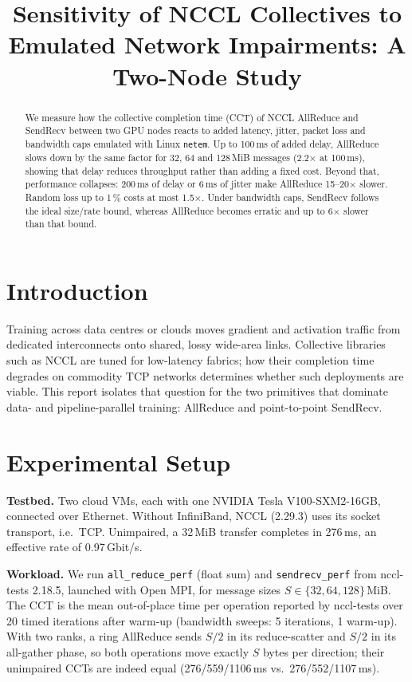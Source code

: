 \documentclass[conference,10pt,a4paper]{IEEEtran}
\begin{document}
\title{Sensitivity of NCCL Collectives to Emulated Network Impairments: A Two-Node Study}
\author{
}
\maketitle

\begin{abstract}
We measure how the collective completion time (CCT) of NCCL AllReduce and SendRecv between two GPU nodes reacts to added latency, jitter, packet loss and bandwidth caps emulated with Linux \texttt{netem}. Up to 100\,ms of added delay, AllReduce slows down by the same factor for 32, 64 and 128\,MiB messages (2.2$\times$ at 100\,ms), showing that delay reduces throughput rather than adding a fixed cost. Beyond that, performance collapses: 200\,ms of delay or 6\,ms of jitter make AllReduce 15--20$\times$ slower. Random loss up to 1\,\% costs at most 1.5$\times$. Under bandwidth caps, SendRecv follows the ideal size/rate bound, whereas AllReduce becomes erratic and up to 6$\times$ slower than that bound.
\end{abstract}

\section{Introduction}
Training across data centres or clouds moves gradient and activation traffic from dedicated interconnects onto shared, lossy wide-area links. Collective libraries such as NCCL are tuned for low-latency fabrics; how their completion time degrades on commodity TCP networks determines whether such deployments are viable. This report isolates that question for the two primitives that dominate data- and pipeline-parallel training: AllReduce and point-to-point SendRecv.

\section{Experimental Setup}
\textbf{Testbed.} Two cloud VMs, each with one NVIDIA Tesla V100-SXM2-16GB, connected over Ethernet. Without InfiniBand, NCCL (2.29.3) uses its socket transport, i.e.\ TCP. Unimpaired, a 32\,MiB transfer completes in 276\,ms, an effective rate of 0.97\,Gbit/s.

\textbf{Workload.} We run \texttt{all\_reduce\_perf} (float sum) and \texttt{sendrecv\_perf} from nccl-tests 2.18.5, launched with Open MPI, for message sizes $S\in\{32, 64, 128\}$\,MiB. The CCT is the mean out-of-place time per operation reported by nccl-tests over 20 timed iterations after warm-up (bandwidth sweeps: 5 iterations, 1 warm-up). With two ranks, a ring AllReduce sends $S/2$ in its reduce-scatter and $S/2$ in its all-gather phase, so both operations move exactly $S$ bytes per direction; their unimpaired CCTs are indeed equal (276/559/1106\,ms vs.\ 276/552/1107\,ms).
\end{document}
